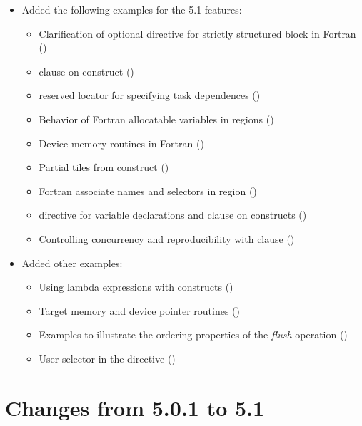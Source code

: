 \begin{itemize}
\item Added the following examples for the 5.1 features:
\begin{itemize}
  \item Clarification of optional  directive for strictly structured 
      block in Fortran ()
  \item {} clause on  construct ()
  \item {} reserved locator for specifying task dependences
      ()
  \item Behavior of Fortran allocatable variables in  regions
      ()
  \item Device memory routines in Fortran
      ()
  \item Partial tiles from  construct
      ()
  \item Fortran associate names and selectors in  region
      ()
  \item {} directive for variable declarations and 
       clause on  constructs
      ()
  \item Controlling concurrency and reproducibility with  clause
      ()
\end{itemize}

\item Added other examples:
\begin{itemize}
  \item Using lambda expressions with  constructs
     ()
  \item Target memory and device pointer routines
     ()
  \item Examples to illustrate the ordering properties of 
     the \emph{flush} operation ()
  \item User selector in the  directive
     ()
\end{itemize}

\end{itemize}

\section{Changes from 5.0.1 to 5.1}
\label{sec:history_501_to_51}

